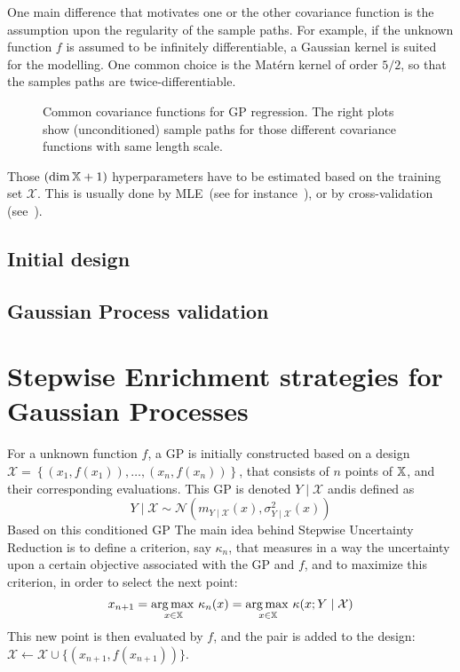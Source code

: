 \documentclass[../../Main_ManuscritThese.tex]{subfiles}
\newcommand\imgpath{/home/victor/acadwriting/Manuscrit/Text/Chapter4/img/}
\begin{document}
  One main difference that motivates one or the other covariance function is the assumption upon the regularity of the sample paths. For example, if the unknown function $f$ is assumed to be infinitely differentiable, a Gaussian kernel is suited for the modelling. One common choice is the Matérn kernel of order $5/2$, so that the samples paths are twice-differentiable.

  
\begin{figure}[ht]
  \centering
  
  \caption{\label{fig:cov_fc_examples} Common covariance functions for GP regression. The right plots show (unconditioned) sample paths for those different covariance functions with same length scale.}
\end{figure}

Those $(\dim \mathbb{X} + 1)$ hyperparameters have to be estimated based on the training set $\mathcal{X}$. This is usually done by MLE~(see for instance~\cite{ribaud_robustness_2019}), or by cross-validation (see~\cite{ginsbourger_note_2009}).

\subsection{Initial design}

\subsection{Gaussian Process validation}
\label{sec:GP_validation}


\section{Stepwise Enrichment strategies for Gaussian Processes}
\label{sec:enrichment_strategies}
For a unknown function $f$, a GP is initially constructed based on a design $\mathcal{X} = \left\{\left(x_1,f(x_1)\right), \dots, \left(x_n, f(x_n)\right)\right\}$, that consists of $n$ points of $\mathbb{X}$, and their corresponding evaluations. This GP is denoted $Y \mid \mathcal{X}$ andis defined as
\begin{equation}
  \label{eq:YgivenXGP}
  Y\mid \mathcal{X} \sim \mathcal{N}(m_{Y\mid\mathcal{X}}(x),\sigma^2_{Y\mid\mathcal{X}}(x))
\end{equation}
Based on this conditioned GP  
The main idea behind Stepwise Uncertainty Reduction is to define a criterion, say $\kappa_n$, that measures in a way the uncertainty upon a certain objective associated with the GP and $f$, and to maximize this criterion, in order to select the next point:
\begin{equation}
  x_{n+1} = \operatorname*{arg\,max \,}_{x\in\mathbb{X}} \kappa_n(x) = \operatorname*{arg\,max \,}_{x\in\mathbb{X}} \kappa(x; Y \mid \mathcal{X})
\end{equation}
This new point is then evaluated by $f$, and the pair is added to the design: $\mathcal{X} \gets \mathcal{X} \cup \{(x_{n+1}, f(x_{n+1}))\}$.
\end{document}
